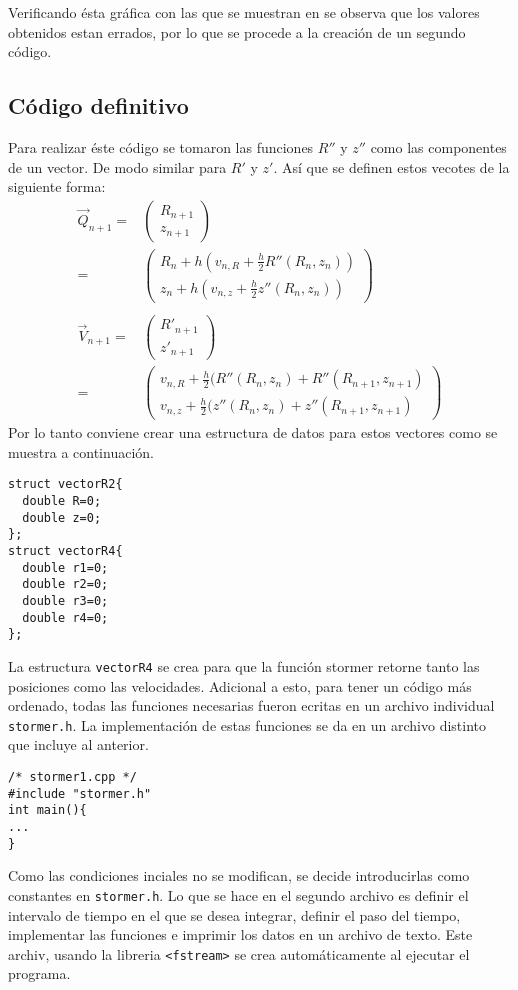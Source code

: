\documentclass[10pt,twocolumn]{article}
\begin{document}
Verificando ésta gráfica con las que se muestran en \cite{traj} se observa que los valores obtenidos estan errados, por lo que se procede a la creación de un segundo código.
\lstset{style=colorss}
\subsection{Código definitivo}
Para realizar éste código se tomaron las funciones $R''$ y $z''$ como las componentes de un vector. De modo similar para $R'$ y $z'$. Así que se definen estos vecotes de la siguiente forma:
\begin{equation}
\begin{split}
\vec{Q}_{n+1}=&\begin{pmatrix}
R_{n+1}\\
z_{n+1}
\end{pmatrix}\\
=&\begin{pmatrix}
R_n+h(v_{n,R}+\frac{h}{2}R''(R_n,z_n))\\
z_n+h(v_{n,z}+\frac{h}{2}z''(R_n,z_n))
\end{pmatrix}\\
\\
\vec{V}_{n+1}=&\begin{pmatrix}
R'_{n+1}\\
z'_{n+1}
\end{pmatrix}\\
=&\begin{pmatrix}
v_{n,R}+\frac{h}{2}(R''(R_n,z_n)+R''(R_{n+1},z_{n+1})\\
v_{n,z}+\frac{h}{2}(z''(R_n,z_n)+z''(R_{n+1},z_{n+1})
\end{pmatrix}
\end{split}
\end{equation}
Por lo tanto conviene crear una estructura de datos para estos vectores como se muestra a continuación.
\begin{lstlisting}[frame=single]
struct vectorR2{
  double R=0;
  double z=0;
};
struct vectorR4{
  double r1=0;
  double r2=0;
  double r3=0;
  double r4=0;
};
\end{lstlisting}
La estructura \texttt{vectorR4} se crea para que la función stormer retorne tanto las posiciones como las velocidades. 
Adicional a esto, para tener un código más ordenado, todas las funciones necesarias fueron ecritas en un archivo individual \texttt{stormer.h}. La implementación de estas funciones se da en un archivo distinto que incluye al anterior.
\begin{lstlisting}[frame=single]
/* stormer1.cpp */
#include "stormer.h"
int main(){
...
}
\end{lstlisting}
Como las condiciones inciales no se modifican, se decide introducirlas como constantes en \texttt{stormer.h}. Lo que se hace en el segundo archivo es definir el intervalo de tiempo en el que se desea integrar, definir el paso del tiempo, implementar las funciones e imprimir los datos en un archivo de texto. Este archiv, usando la libreria \texttt{<fstream>} se crea automáticamente al ejecutar el programa. 
\end{document}

